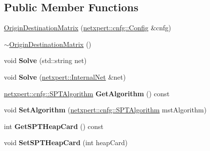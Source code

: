 \subsection*{Public Member Functions}
\begin{DoxyCompactItemize}
\item 
\hyperlink{classnetxpert_1_1OriginDestinationMatrix_a2ffcb9a8e1698ac09145d5ab08cfb8f4}{Origin\+Destination\+Matrix} (\hyperlink{structnetxpert_1_1cnfg_1_1Config}{netxpert\+::cnfg\+::\+Config} \&cnfg)
\item 
\hyperlink{classnetxpert_1_1OriginDestinationMatrix_ae2337bd32fe54db9027a0ae5612bf247}{$\sim$\+Origin\+Destination\+Matrix} ()
\item 
void {\bfseries Solve} (std\+::string net)\hypertarget{classnetxpert_1_1OriginDestinationMatrix_a6021a419ef2db34a079e508b79b94656}{}\label{classnetxpert_1_1OriginDestinationMatrix_a6021a419ef2db34a079e508b79b94656}

\item 
void {\bfseries Solve} (\hyperlink{classnetxpert_1_1InternalNet}{netxpert\+::\+Internal\+Net} \&net)\hypertarget{classnetxpert_1_1OriginDestinationMatrix_a78f9ae34b0a3caa0711fd4806ce2cad7}{}\label{classnetxpert_1_1OriginDestinationMatrix_a78f9ae34b0a3caa0711fd4806ce2cad7}

\item 
\hyperlink{namespacenetxpert_1_1cnfg_a6ff755ed7f76e0049e3eeeed86c9b55d}{netxpert\+::cnfg\+::\+S\+P\+T\+Algorithm} {\bfseries Get\+Algorithm} () const \hypertarget{classnetxpert_1_1OriginDestinationMatrix_a1ce368d57c55f63a8a3d8a956246f51c}{}\label{classnetxpert_1_1OriginDestinationMatrix_a1ce368d57c55f63a8a3d8a956246f51c}

\item 
void {\bfseries Set\+Algorithm} (\hyperlink{namespacenetxpert_1_1cnfg_a6ff755ed7f76e0049e3eeeed86c9b55d}{netxpert\+::cnfg\+::\+S\+P\+T\+Algorithm} mst\+Algorithm)\hypertarget{classnetxpert_1_1OriginDestinationMatrix_a97634a566c9cb0f4d16f09460695dca5}{}\label{classnetxpert_1_1OriginDestinationMatrix_a97634a566c9cb0f4d16f09460695dca5}

\item 
int {\bfseries Get\+S\+P\+T\+Heap\+Card} () const \hypertarget{classnetxpert_1_1OriginDestinationMatrix_a9a74ba346eb886f6364cf8ee49fc999b}{}\label{classnetxpert_1_1OriginDestinationMatrix_a9a74ba346eb886f6364cf8ee49fc999b}

\item 
void {\bfseries Set\+S\+P\+T\+Heap\+Card} (int heap\+Card)\hypertarget{classnetxpert_1_1OriginDestinationMatrix_a3eccac28a93415efcde47fb7c5864513}{}\label{classnetxpert_1_1OriginDestinationMatrix_a3eccac28a93415efcde47fb7c5864513}


\end{DoxyCompactItemize}
